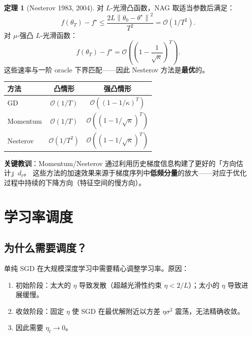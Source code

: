 \documentclass[12pt,a4paper]{ctexart}
\theoremstyle{definition}
\newtheorem{theorem}{定理}[section]
\theoremstyle{plain}
\newcommand{\norm}[1]{\left\lVert #1 \right\rVert}
\begin{document}
\begin{theorem}[Nesterov 1983, 2004]
  对 $L$-光滑凸函数，NAG 取适当参数后满足：
  \begin{equation}
    f(\theta_T) - f^\star \le \frac{2L\norm{\theta_0 - \theta^\star}^2}{T^2} = \mathcal{O}(1/T^2).
  \end{equation}
  对 $\mu$-强凸 $L$-光滑函数：
  \begin{equation}
    f(\theta_T) - f^\star = \mathcal{O}\!\left(\left(1 - \frac{1}{\sqrt{\kappa}}\right)^T\right).
  \end{equation}
  这些速率与一阶 oracle 下界匹配——因此 Nesterov 方法是\textbf{最优}的。
\end{theorem}

\begin{center}
\begin{tabular}{lcc}
\toprule
方法 & 凸情形 & 强凸情形 \\
\midrule
GD & $\mathcal{O}(1/T)$ & $\mathcal{O}((1 - 1/\kappa)^T)$ \\
Momentum & $\mathcal{O}(1/T)$ & $\mathcal{O}((1 - 1/\sqrt{\kappa})^T)$ \\
Nesterov & $\mathcal{O}(1/T^2)$ & $\mathcal{O}((1 - 1/\sqrt{\kappa})^T)$ \\
\bottomrule
\end{tabular}
\end{center}

\textbf{关键教训}：Momentum/Nesterov 通过利用历史梯度信息构建了更好的「方向估计」$d_t$。
这些方法的加速效果来源于梯度序列中\textbf{低频分量}的放大——对应于优化过程中持续的下降方向（特征空间的慢方向）。

\section{学习率调度}

\subsection{为什么需要调度？}

单纯 SGD 在大规模深度学习中需要精心调整学习率。原因：
\begin{enumerate}[label=(\arabic*)]
  \item 初始阶段：太大的 $\eta$ 导致发散（超越光滑性约束 $\eta < 2/L$）；太小的 $\eta$ 导致进展缓慢。
  \item 收敛阶段：固定 $\eta$ 使 SGD 在最优解附近以方差 $\eta\sigma^2$ 震荡，无法精确收敛。
  \item 因此需要 $\eta_t \to 0$。
\end{enumerate}
\end{document}

